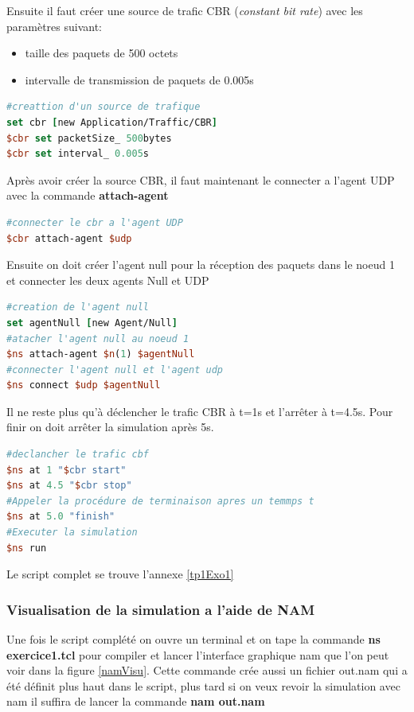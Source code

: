 \documentclass[11pt]{article}
\begin{document}
Ensuite il faut créer une source de trafic CBR (\textit{constant bit rate}) avec les paramètres suivant:
\begin{itemize}
	\item taille des paquets de 500 octets
	\item intervalle de transmission de paquets de 0.005s
\end{itemize}

\begin{lstlisting}[language=tcl, numbers=none, framexleftmargin=0pt, 	framextopmargin=0pt, framexbottommargin=0pt]
#creattion d'un source de trafique
set cbr [new Application/Traffic/CBR]
$cbr set packetSize_ 500bytes
$cbr set interval_ 0.005s
\end{lstlisting}


Après avoir créer la source CBR, il faut maintenant le connecter a l'agent UDP avec la commande \textbf{attach-agent}
\begin{lstlisting}[language=tcl, numbers=none, framexleftmargin=0pt, 	framextopmargin=0pt, framexbottommargin=0pt]
#connecter le cbr a l'agent UDP
$cbr attach-agent $udp
\end{lstlisting}


Ensuite on doit créer l'agent null pour la réception des paquets dans le noeud 1 et connecter les deux agents Null et UDP
\begin{lstlisting}[language=tcl, numbers=none, framexleftmargin=0pt, 	framextopmargin=0pt, framexbottommargin=0pt]
#creation de l'agent null
set agentNull [new Agent/Null]
#atacher l'agent null au noeud 1
$ns attach-agent $n(1) $agentNull 
#connecter l'agent null et l'agent udp
$ns connect $udp $agentNull 
\end{lstlisting}

Il ne reste plus qu'à déclencher le trafic CBR à t=1s et l’arrêter à t=4.5s. Pour finir on doit arrêter la simulation après 5s. 
\begin{lstlisting}[language=tcl, numbers=none, framexleftmargin=0pt, 	framextopmargin=0pt, framexbottommargin=0pt]
#declancher le trafic cbf
$ns at 1 "$cbr start"
$ns at 4.5 "$cbr stop"
#Appeler la procédure de terminaison apres un temmps t 
$ns at 5.0 "finish"
#Executer la simulation
$ns run
\end{lstlisting}



\noindent
Le script complet se trouve l'annexe \ref{tp1Exo1}

\subsubsection{Visualisation de la simulation a l'aide de NAM}
Une fois le script complété on ouvre un terminal et on tape la commande \textbf{ns exercice1.tcl} pour compiler et lancer l'interface graphique nam que l'on peut voir dans la figure \ref{namVisu}. Cette commande crée aussi un fichier out.nam qui a été définit plus haut dans le script, plus tard si on veux revoir la simulation avec nam il suffira de lancer la commande \textbf{nam out.nam}
\end{document}
